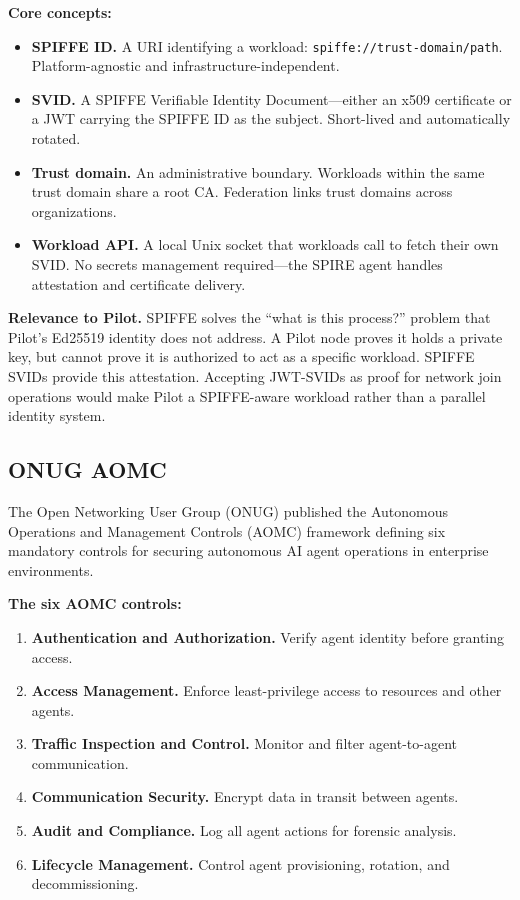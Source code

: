 \documentclass[11pt,a4paper]{article}
\begin{document}
\textbf{Core concepts:}
\begin{itemize}
    \item \textbf{SPIFFE ID.} A URI identifying a workload: \texttt{spiffe://trust-domain/path}. Platform-agnostic and infrastructure-independent.
    \item \textbf{SVID.} A SPIFFE Verifiable Identity Document---either an x509 certificate or a JWT carrying the SPIFFE ID as the subject. Short-lived and automatically rotated.
    \item \textbf{Trust domain.} An administrative boundary. Workloads within the same trust domain share a root CA. Federation links trust domains across organizations.
    \item \textbf{Workload API.} A local Unix socket that workloads call to fetch their own SVID. No secrets management required---the SPIRE agent handles attestation and certificate delivery.
\end{itemize}

\textbf{Relevance to Pilot.} SPIFFE solves the ``what is this process?'' problem that Pilot's Ed25519 identity does not address. A Pilot node proves it holds a private key, but cannot prove it is authorized to act as a specific workload. SPIFFE SVIDs provide this attestation. Accepting JWT-SVIDs as proof for network join operations would make Pilot a SPIFFE-aware workload rather than a parallel identity system.

\subsection{ONUG AOMC}

The Open Networking User Group (ONUG) published the Autonomous Operations and Management Controls (AOMC) framework defining six mandatory controls for securing autonomous AI agent operations in enterprise environments.

\textbf{The six AOMC controls:}
\begin{enumerate}
    \item \textbf{Authentication and Authorization.} Verify agent identity before granting access.
    \item \textbf{Access Management.} Enforce least-privilege access to resources and other agents.
    \item \textbf{Traffic Inspection and Control.} Monitor and filter agent-to-agent communication.
    \item \textbf{Communication Security.} Encrypt data in transit between agents.
    \item \textbf{Audit and Compliance.} Log all agent actions for forensic analysis.
    \item \textbf{Lifecycle Management.} Control agent provisioning, rotation, and decommissioning.
\end{enumerate}
\end{document}
